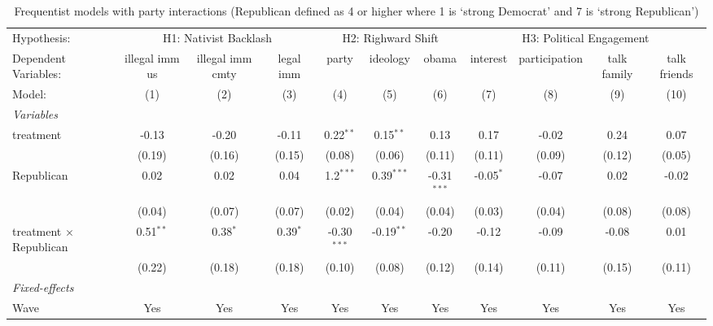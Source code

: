 
\begin{table}[htbp]
   \caption{\label{tab:rep_3} Frequentist models with party interactions (Republican defined as 4 or higher where 1 is `strong Democrat' and 7 is `strong Republican')}
   \centering
   \begin{tabular}{lcccccccccc}
      \tabularnewline \midrule \midrule
      Hypothesis: & \multicolumn{3}{c}{H1: Nativist Backlash} & \multicolumn{3}{c}{H2: Righward Shift} & \multicolumn{4}{c}{H3: Political Engagement} \\ 
      Dependent Variables:           & illegal imm us & illegal imm cmty & legal imm  & party         & ideology     & obama         & interest    & participation & talk family & talk friends\\  
      Model:                         & (1)            & (2)              & (3)        & (4)           & (5)          & (6)           & (7)         & (8)           & (9)         & (10)\\  
      \midrule
      \emph{Variables}\\
      treatment                      & -0.13          & -0.20            & -0.11      & 0.22$^{**}$   & 0.15$^{**}$  & 0.13          & 0.17        & -0.02         & 0.24        & 0.07\\   
                                     & (0.19)         & (0.16)           & (0.15)     & (0.08)        & (0.06)       & (0.11)        & (0.11)      & (0.09)        & (0.12)      & (0.05)\\   
      Republican                     & 0.02           & 0.02             & 0.04       & 1.2$^{***}$   & 0.39$^{***}$ & -0.31$^{***}$ & -0.05$^{*}$ & -0.07         & 0.02        & -0.02\\   
                                     & (0.04)         & (0.07)           & (0.07)     & (0.02)        & (0.04)       & (0.04)        & (0.03)      & (0.04)        & (0.08)      & (0.08)\\   
      treatment $\times$ Republican  & 0.51$^{**}$    & 0.38$^{*}$       & 0.39$^{*}$ & -0.30$^{***}$ & -0.19$^{**}$ & -0.20         & -0.12       & -0.09         & -0.08       & 0.01\\   
                                     & (0.22)         & (0.18)           & (0.18)     & (0.10)        & (0.08)       & (0.12)        & (0.14)      & (0.11)        & (0.15)      & (0.11)\\   
      \midrule
      \emph{Fixed-effects}\\
      Wave                           & Yes            & Yes              & Yes        & Yes           & Yes          & Yes           & Yes         & Yes           & Yes         & Yes\\  

\end{tabular}
\end{table}
